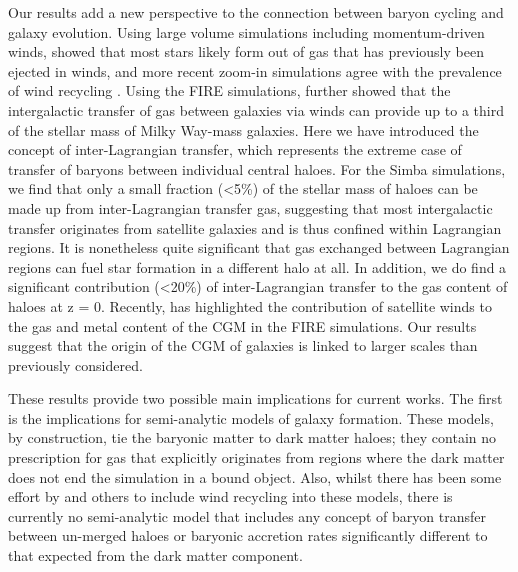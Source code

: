 \documentclass[fleqn,usenatbib]{mnras}
\newcommand{\simba}{{\sc Simba}}
\begin{document}
Our results add a new perspective to the connection between baryon cycling
and galaxy evolution. Using large volume simulations including
momentum-driven winds, \citet{Oppenheimer2010} showed that most stars likely
form out of gas that has previously been ejected in winds, and more recent
zoom-in simulations agree with the prevalence of wind recycling
\citep{Christensen2016, AnglesAlcazar2017, Tollet2019}. Using the FIRE
simulations, \citet{AnglesAlcazar2017} further showed that the intergalactic
transfer of gas between galaxies via winds can provide up to a third of the
stellar mass of Milky Way-mass galaxies. Here we have introduced the concept
of inter-Lagrangian transfer, which represents the extreme case of transfer
of baryons between individual central haloes. For the \simba{} simulations,
we find that only a small fraction (<5\%) of the stellar mass of haloes can
be made up from inter-Lagrangian transfer gas, suggesting that most
intergalactic transfer originates from satellite galaxies and is thus
confined within Lagrangian regions. It is nonetheless quite significant that
gas exchanged between Lagrangian regions can fuel star formation in a
different halo at all. In addition, we do find a significant contribution
(<20\%) of inter-Lagrangian transfer to the gas content of haloes at z = 0.
Recently, \citet{Hafen2019, Hafen2019b} has highlighted the contribution of
satellite winds to the gas and metal content of the CGM in the FIRE
simulations. Our results suggest that the origin of the CGM of galaxies is
linked to larger scales than previously considered.

These results provide two possible main implications for current works. The
first is the implications for semi-analytic models of galaxy formation. These
models, by construction, tie the baryonic matter to dark matter haloes; they
contain no prescription for gas that explicitly originates from regions where
the dark matter does not end the simulation in a bound object. Also, whilst
there has been some effort by \citet{Henriques2015, White2015} and others to
include wind recycling into these models, there is currently no semi-analytic
model that includes any concept of baryon transfer between un-merged haloes
or baryonic accretion rates significantly different to that expected from the
dark matter component.
\end{document}
